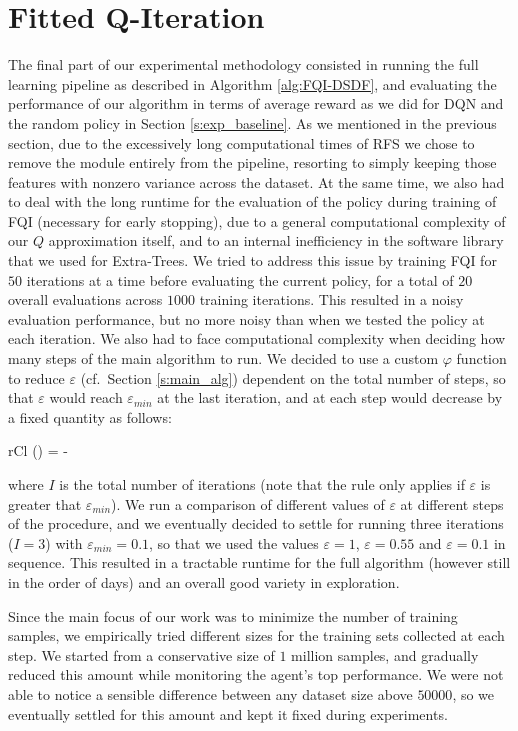 \section{Fitted Q-Iteration} \label{s:exp_fqi}
The final part of our experimental methodology consisted in running the full
learning pipeline as described in Algorithm \ref{alg:FQI-DSDF}, and evaluating
the performance of our algorithm in terms of average reward as we did for DQN
and the random policy in Section \ref{s:exp_baseline}. 
As we mentioned in the previous section, due to the excessively long 
computational times of RFS we chose to remove the module entirely from the 
pipeline, resorting to simply keeping those features with nonzero variance 
across the dataset. 
At the same time, we also had to deal with the long runtime for the evaluation 
of the policy during training of FQI (necessary for early stopping), due to a 
general computational complexity of our $Q$ approximation itself, and to an 
internal inefficiency in the software library that we used for Extra-Trees.
We tried to address this issue by training FQI for $50$ iterations at a time
before evaluating the current policy, for a total of $20$ overall evaluations
across $1000$ training iterations. 
This resulted in a noisy evaluation performance, but no more noisy than when we
tested the policy at each iteration. 
We also had to face computational complexity when deciding how many steps
of the main algorithm to run. 
We decided to use a custom $\varphi$ function to reduce $\varepsilon$ (cf.\ 
Section \ref{s:main_alg}) dependent on the total number of steps, so that 
$\varepsilon$ would reach $\varepsilon_{min}$ at the last iteration, and 
at each step would decrease by a fixed quantity as follows:
%
\begin{IEEEeqnarray}{rCl}
    \varphi(\varepsilon) = \varepsilon - 
\end{IEEEeqnarray}
%
where $I$ is the total number of iterations (note that the rule only 
applies if $\varepsilon$ is greater that $\varepsilon_{min}$). 
We run a comparison of different values of $\varepsilon$ at 
different steps of the procedure, and we eventually decided to settle for 
running three iterations ($I = 3$) with $\varepsilon_{min} = 0.1$, so that we 
used the values $\varepsilon = 1$, $\varepsilon = 0.55$ and 
$\varepsilon = 0.1$ in sequence. 
This resulted in a tractable runtime for the full algorithm (however 
still in the order of days) and an overall good variety in exploration. 

Since the main focus of our work was to minimize the number of training samples,
we empirically tried different sizes for the training sets collected at each
step. We started from a conservative size of $1$ million samples, and gradually
reduced this amount while monitoring the agent's top performance. 
We were not able to notice a sensible difference between any dataset size above
$50000$, so we eventually settled for this amount and kept it fixed during 
experiments.

